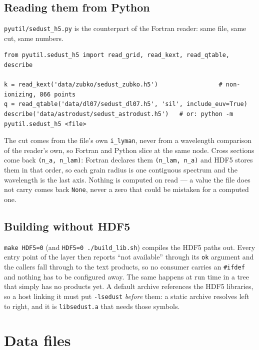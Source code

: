 \documentclass{my_memo}
\newcommand{\code}[1]{\texttt{#1}}
\begin{document}
\subsection{Reading them from Python}

\code{pyutil/sedust\_h5.py} is the counterpart of the Fortran reader: same file,
same cut, same numbers.

\begin{lstlisting}
from pyutil.sedust_h5 import read_grid, read_kext, read_qtable, describe

k = read_kext('data/zubko/sedust_zubko.h5')                 # non-ionizing, 866 points
q = read_qtable('data/dl07/sedust_dl07.h5', 'sil', include_euv=True)
describe('data/astrodust/sedust_astrodust.h5')   # or: python -m pyutil.sedust_h5 <file>
\end{lstlisting}

\noindent The cut comes from the file's own \code{i\_lyman}, never from a
wavelength comparison of the reader's own, so Fortran and Python slice at the
same node. Cross sections come back \code{(n\_a, n\_lam)}: Fortran declares them
\code{(n\_lam, n\_a)} and HDF5 stores them in that order, so each grain radius is
one contiguous spectrum and the wavelength is the last axis. Nothing is
computed on read --- a value the file does not carry comes back \code{None},
never a zero that could be mistaken for a computed one.

\subsection{Building without HDF5}

\code{make HDF5=0} (and \code{HDF5=0 ./build\_lib.sh}) compiles the HDF5 paths
out. Every entry point of the layer then reports ``not available'' through its
\code{ok} argument and the callers fall through to the text products, so no
consumer carries an \code{\#ifdef} and nothing has to be configured away. The
same happens at run time in a tree that simply has no products yet. A default
archive references the HDF5 libraries, so a host linking it must put
\code{-lsedust} \emph{before} them: a static archive resolves left to right, and
it is \code{libsedust.a} that needs those symbols.

\section{Data files}\label{sec:data}
\end{document}
